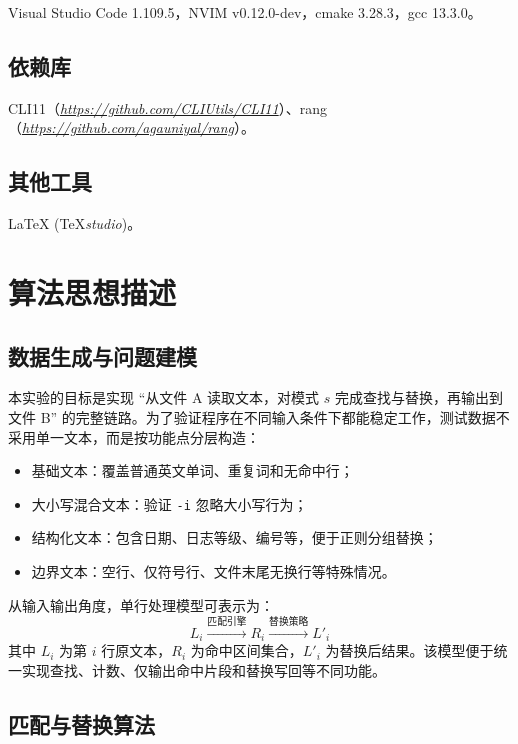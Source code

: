 \documentclass[12pt, a4paper]{ctexart}
\begin{document}
Visual Studio Code 1.109.5，NVIM v0.12.0-dev，cmake 3.28.3，gcc 13.3.0。

\subsection{依赖库}

CLI11（\href{https://github.com/CLIUtils/CLI11}{\textit{https://github.com/CLIUtils/CLI11}}）、rang（\href{https://github.com/agauniyal/rang}{\textit{https://github.com/agauniyal/rang}}）。

\subsection{其他工具}

\LaTeX{} (\TeX\textit{studio})。

\section{算法思想描述}

\subsection{数据生成与问题建模}

本实验的目标是实现 ``从文件 A 读取文本，对模式 $s$ 完成查找与替换，再输出到文件 B'' 的完整链路。为了验证程序在不同输入条件下都能稳定工作，测试数据不采用单一文本，而是按功能点分层构造：

\begin{itemize}
    \item 基础文本：覆盖普通英文单词、重复词和无命中行；
    \item 大小写混合文本：验证 \texttt{-i} 忽略大小写行为；
    \item 结构化文本：包含日期、日志等级、编号等，便于正则分组替换；
    \item 边界文本：空行、仅符号行、文件末尾无换行等特殊情况。
\end{itemize}

从输入输出角度，单行处理模型可表示为：
$$L_i \xrightarrow{\text{匹配引擎}} R_i \xrightarrow{\text{替换策略}} L'_i$$
其中 $L_i$ 为第 $i$ 行原文本，$R_i$ 为命中区间集合，$L'_i$ 为替换后结果。该模型便于统一实现查找、计数、仅输出命中片段和替换写回等不同功能。

\subsection{匹配与替换算法}
\end{document}
